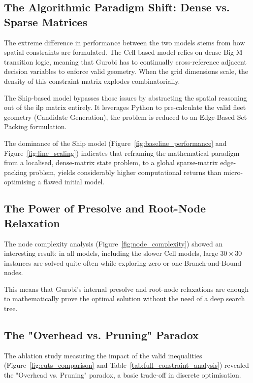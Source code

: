 \subsection{The Algorithmic Paradigm Shift: Dense vs. Sparse Matrices}\label{subsec:algorithmic-paradigm-shift}
The extreme difference in performance between the two models stems from how spatial constraints are formulated. The Cell-based model relies on dense Big-M transition logic, meaning that Gurobi has to continually cross-reference adjacent decision variables to enforce valid geometry. When the grid dimensions scale, the density of this constraint matrix explodes combinatorially.

The Ship-based model bypasses those issues by abstracting the spatial reasoning out of the \gls{ilp} matrix entirely. It leverages Python to pre-calculate the valid fleet geometry (Candidate Generation), the problem is reduced to an Edge-Based Set Packing formulation.

The dominance of the Ship model (Figure~\ref{fig:baseline_performance} and Figure~\ref{fig:line_scaling}) indicates that reframing the mathematical paradigm from a localised, dense-matrix state problem, to a global sparse-matrix edge-packing problem, yields considerably higher computational returns than micro-optimising a flawed initial model.

\subsection{The Power of Presolve and Root-Node Relaxation}\label{subsec:power-of-presolve}
The node complexity analysis (Figure~\ref{fig:node_complexity}) showed an interesting result: in all models, including the slower Cell models, large $30 \times 30$ instances are solved quite often while exploring zero or one Branch-and-Bound nodes. 

This means that Gurobi's internal presolve and root-node relaxations are enough to mathematically prove the optimal solution without the need of a deep search tree.

\subsection{The "Overhead vs. Pruning" Paradox}\label{subsec:overhead-vs-pruning}
The ablation study measuring the impact of the valid inequalities (Figure~\ref{fig:cuts_comparison} and Table~\ref{tab:full_constraint_analysis}) revealed the "Overhead vs. Pruning" paradox, a basic trade-off in discrete optimisation.

